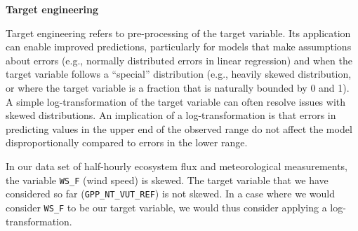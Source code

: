 \documentclass[
]{book}
\newenvironment{Shaded}{\begin{snugshade}}{\end{snugshade}}
\newcommand{\CommentTok}[1]{\textcolor[rgb]{0.56,0.35,0.01}{\textit{#1}}}
\newcommand{\DataTypeTok}[1]{\textcolor[rgb]{0.13,0.29,0.53}{#1}}
\newcommand{\KeywordTok}[1]{\textcolor[rgb]{0.13,0.29,0.53}{\textbf{#1}}}
\newcommand{\NormalTok}[1]{#1}
\newcommand{\OperatorTok}[1]{\textcolor[rgb]{0.81,0.36,0.00}{\textbf{#1}}}
\newcommand{\StringTok}[1]{\textcolor[rgb]{0.31,0.60,0.02}{#1}}
\begin{document}
\textbf{Target engineering}

Target engineering refers to pre-processing of the target variable. Its application can enable improved predictions, particularly for models that make assumptions about errors (e.g., normally distributed errors in linear regression) and when the target variable follows a ``special'' distribution (e.g., heavily skewed distribution, or where the target variable is a fraction that is naturally bounded by 0 and 1). A simple log-transformation of the target variable can often resolve issues with skewed distributions. An implication of a log-transformation is that errors in predicting values in the upper end of the observed range do not affect the model disproportionally compared to errors in the lower range.

In our data set of half-hourly ecosystem flux and meteorological measurements, the variable \texttt{WS\_F} (wind speed) is skewed. The target variable that we have considered so far (\texttt{GPP\_NT\_VUT\_REF}) is not skewed. In a case where we would consider \texttt{WS\_F} to be our target variable, we would thus consider applying a log-transformation.

\begin{Shaded}
\end{Shaded}
\end{document}

